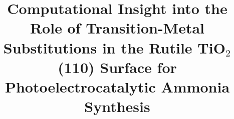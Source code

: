 



\makeatletter
\makeatother

\makeatletter
\makeatother
\title{Computational Insight into the Role of Transition-Metal Substitutions in the Rutile TiO$_2$ (110) Surface for Photoelectrocatalytic Ammonia Synthesis}



